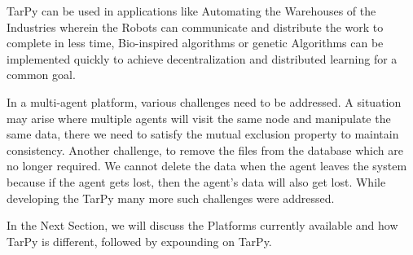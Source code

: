 \bigbreak
TarPy can be used in applications like Automating the Warehouses of the Industries wherein the Robots can communicate and distribute the work to complete in less time, Bio-inspired algorithms or genetic Algorithms can be implemented quickly to achieve decentralization and distributed learning for a common goal.\par


\bigbreak
In a multi-agent platform, various challenges need to be addressed. A situation may arise where multiple agents will visit the same node and manipulate the same data, there we need to satisfy the mutual exclusion property to maintain consistency.  Another challenge, to remove the files from the database which are no longer required. We cannot delete the data when the agent leaves the system because if the agent gets lost, then the agent's data will also get lost. While developing the TarPy many more such challenges were addressed.
\par

\bigbreak
In the Next Section, we will discuss the Platforms currently available and how TarPy is different, followed by expounding on TarPy.\par

